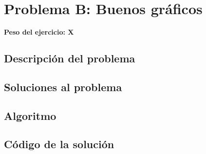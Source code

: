 \newpage{}
\section{Problema B: Buenos gráficos}
\textbf{Peso del ejercicio: X}
\subsection{Descripción del problema}
\subsection{Soluciones al problema}
\subsection{Algoritmo}
\newpage
\subsection{Código de la solución}
%
